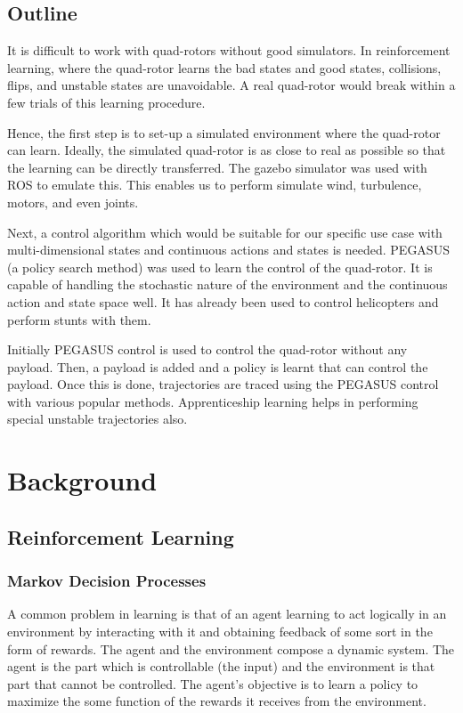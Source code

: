 \documentclass[hidelinks,BTech]{iitmdiss}
\begin{document}
\section{Outline}

It is difficult to work with quad-rotors without good simulators. In reinforcement learning, where the quad-rotor learns the bad states and good states, collisions, flips, and unstable states are unavoidable. A real quad-rotor would break within a few trials of this learning procedure.

Hence, the first step is to set-up a simulated environment where the quad-rotor can learn. Ideally, the simulated quad-rotor is as close to real as possible so that the learning can be directly transferred. The gazebo simulator was used with ROS to emulate this. This enables us to perform simulate wind, turbulence, motors, and even joints.

Next, a control algorithm which would be suitable for our specific use case with multi-dimensional states and continuous actions and states is needed. PEGASUS (a policy search method) was used to learn the control of the quad-rotor. It is capable of handling the stochastic nature of the environment and the continuous action and state space well. It has already been used to control helicopters and perform stunts with them.

Initially PEGASUS control is used to control the quad-rotor without any payload. Then, a payload is added and a policy is learnt that can control the payload. Once this is done, trajectories are traced using the PEGASUS control with various popular methods. Apprenticeship learning helps in performing special unstable trajectories also.

\chapter{Background}

\section{Reinforcement Learning}

\subsection{Markov Decision Processes}
A common problem in learning is that of an agent learning to act logically in an environment by interacting with it and obtaining feedback of some sort in the form of rewards. The agent and the environment compose a dynamic system. The agent is the part which is controllable (the input) and the environment is that part that cannot be controlled. The agent's objective is to learn a policy to maximize the some function of the rewards it receives from the environment.
\end{document}
